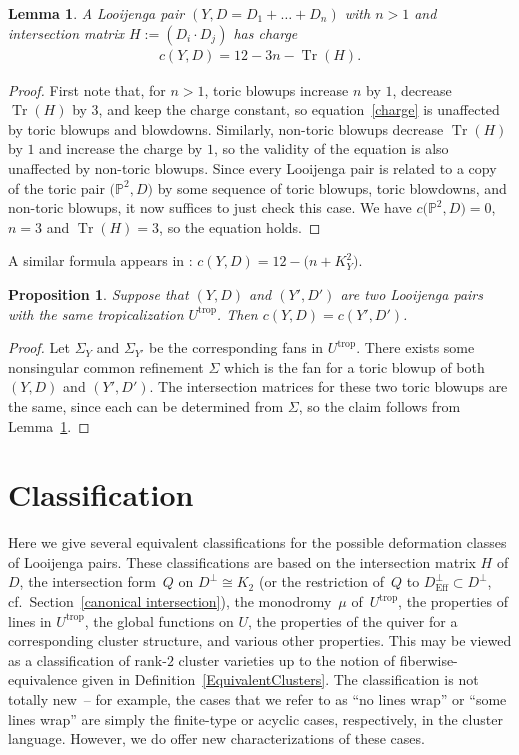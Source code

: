 \documentclass[11pt]{article}
\numberwithin{equation}{section}
\numberwithin{figure}{section}
\numberwithin{table}{section}
\DeclareMathOperator{\Tr}{Tr}
\DeclareMathOperator{\trop}{trop}
\DeclareMathOperator{\Eff}{Eff}
\let\bb=\mathbb
\newtheorem{lem}[thm]{Lemma}
\newtheorem{prop}[thm]{Proposition}
\theoremstyle{definition}
\begin{document}
\begin{lem} \label{ch}A Looijenga pair $(Y,D=D_1+\dots+D_n)$ with $n>1$ and intersection matrix $H:= (D_i\cdot D_j )$ has charge
\begin{gather}\label{charge}
	c(Y,D)=12-3n-\Tr(H).
\end{gather}
\end{lem}

\begin{proof}First note that, for $n>1$, toric blowups increase $n$ by $1$, decrease $\Tr(H)$ by $3$, and keep the charge constant, so equation~\eqref{charge} is unaffected by toric blowups and blowdowns. Similarly, non-toric blowups decrease $\Tr(H)$ by $1$ and increase the charge by $1$, so the validity of the equation is also unaffected by non-toric blowups. Since every Looijenga pair is related to a copy of the toric pair $\big(\bb{P}^2,D\big)$ by some sequence of toric blowups, toric blowdowns, and non-toric blowups, it now suffices to just check this case. We have $c\big(\bb{P}^2,D\big)=0$, $n=3$ and $\Tr(H)=3$, so the equation holds.
\end{proof}

A similar formula appears in \cite{GHK2}: $c(Y,D)=12-\big(n+K_Y^2\big)$.

\begin{prop}\label{TropCharge}Suppose that $(Y,D)$ and $(Y',D')$ are two Looijenga pairs with the same tropicalization $U^{\trop}$. Then $c(Y,D)=c(Y',D')$.
\end{prop}

\begin{proof}Let $\Sigma_Y$ and $\Sigma_{Y'}$ be the corresponding fans in $U^{\trop}$. There exists some nonsingular common refinement $\Sigma$ which is the fan for a toric blowup of both $(Y,D)$ and $(Y',D')$. The intersection matrices for these two toric blowups are the same, since each can be determined from $\Sigma$, so the claim follows from Lemma~\ref{ch}.
\end{proof}

\section{Classification}\label{classification}

Here we give several equivalent classifications for the possible deformation classes of Looijenga pairs. These classifications are based on the intersection matrix $H$ of $D$, the intersection form~$Q$ on $D^{\perp}\cong K_2$ (or the restriction of~$Q$ to $D^{\perp}_{\Eff} \subset D^{\perp}$, cf.\ Section~\ref{canonical intersection}), the monodromy~$\mu$ of~$U^{\trop}$, the properties of lines in $U^{\trop}$, the global functions on $U$, the properties of the quiver for a corresponding cluster structure, and various other properties. This may be viewed as a classification of rank-$2$ cluster varieties up to the notion of fiberwise-equivalence given in Definition~\ref{EquivalentClusters}. The classification is not totally new~-- for example, the cases that we refer to as ``no lines wrap'' or ``some lines wrap'' are simply the finite-type or acyclic cases, respectively, in the cluster language. However, we do offer new characterizations of these cases.
\end{document}
